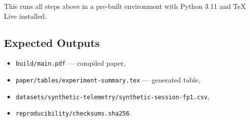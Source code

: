 This runs all steps above in a pre-built environment with Python 3.11 and
TeX Live installed.

\subsection{Expected Outputs}

\begin{itemize}
  \item \texttt{build/main.pdf} --- compiled paper,
  \item \texttt{paper/tables/experiment-summary.tex} --- generated table,
  \item \texttt{datasets/synthetic-telemetry/synthetic-session-fp1.csv},
  \item \texttt{reproducibility/checksums.sha256}.
\end{itemize}
